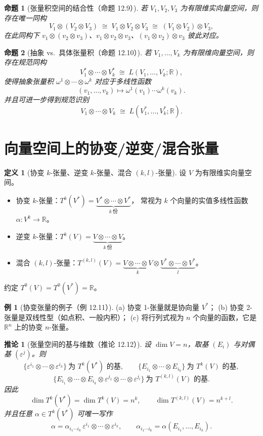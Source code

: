 \documentclass[11pt]{article}
\theoremstyle{definition}
\newtheorem{definition}{定义}[section]
\newtheorem{example}{例}[section]
\theoremstyle{plain}
\newtheorem{proposition}{命题}[section]
\newtheorem{corollary}{推论}[section]
\newcommand{\R}{\mathbb{R}}
\newcommand{\ot}{\otimes}
\begin{document}
\begin{proposition}[张量积空间的结合性（命题 12.9）]
若 $V_1,V_2,V_3$ 为有限维实向量空间，则存在唯一同构
\[
V_1\ot(V_2\ot V_3)\;\cong\; V_1\ot V_2\ot V_3\;\cong\; (V_1\ot V_2)\ot V_3,
\]
在此同构下 $v_1\ot(v_2\ot v_3)$、$v_1\ot v_2\ot v_3$、$(v_1\ot v_2)\ot v_3$ 彼此对应。
\end{proposition}

\begin{proposition}[抽象 vs.\ 具体张量积（命题 12.10）]
若 $V_1,\dots,V_k$ 为有限维向量空间，则存在规范同构
\[
V_1^*\ot\cdots\ot V_k^*\;\cong\; L(V_1,\dots,V_k;\R),
\]
使得抽象张量积 $\omega^1\ot\cdots\ot\omega^k$ 对应于多线性函数
\[
(v_1,\dots,v_k)\mapsto \omega^1(v_1)\cdots\omega^k(v_k).
\]
并且可进一步得到规范识别
\[
V_1\ot\cdots\ot V_k\;\cong\; L(V_1^*,\dots,V_k^*;\R).
\]
\end{proposition}

\section{向量空间上的协变/逆变/混合张量}

\begin{definition}[协变 $k$-张量、逆变 $k$-张量、混合 $(k,l)$-张量]
设 $V$ 为有限维实向量空间。
\begin{itemize}[leftmargin=2em]
\item 协变 $k$-张量：$T^k(V^*)= \underbrace{V^*\ot\cdots\ot V^*}_{k\ \text{份}}$，
常视为 $k$ 个向量的实值多线性函数 $\alpha:V^k\to\R$。
\item 逆变 $k$-张量：$T^k(V)= \underbrace{V\ot\cdots\ot V}_{k\ \text{份}}$。
\item 混合 $(k,l)$-张量：$T^{(k,l)}(V)= \underbrace{V\ot\cdots\ot V}_{k}\ot \underbrace{V^*\ot\cdots\ot V^*}_{l}$。
\end{itemize}
约定 $T^0(V)=T^0(V^*)=\R$。
\end{definition}

\begin{example}[协变张量的例子（例 12.11）]
(a) 协变 1-张量就是协向量 $V^*$；\quad
(b) 协变 2-张量是双线性型（如点积、一般内积）；\quad
(c) 将行列式视为 $n$ 个向量的函数，它是 $\R^n$ 上的协变 $n$-张量。
\end{example}

\begin{corollary}[张量空间的基与维数（推论 12.12）]
设 $\dim V=n$，取基 $(E_i)$ 与对偶基 $(\varepsilon^j)$。则
\[
\{\varepsilon^{i_1}\ot\cdots\ot\varepsilon^{i_k}\}\ \text{为 }T^k(V^*)\text{ 的基},\qquad
\{E_{i_1}\ot\cdots\ot E_{i_k}\}\ \text{为 }T^k(V)\text{ 的基},
\]
\[
\{E_{i_1}\ot\cdots\ot E_{i_k}\ot \varepsilon^{j_1}\ot\cdots\ot \varepsilon^{j_l}\}\ \text{为 }T^{(k,l)}(V)\text{ 的基}.
\]
因此
\[
\dim T^k(V^*)=\dim T^k(V)=n^k,\qquad \dim T^{(k,l)}(V)=n^{k+l}.
\]
并且任意 $\alpha\in T^k(V^*)$ 可唯一写作
\[
\alpha=\alpha_{i_1\cdots i_k}\,\varepsilon^{i_1}\ot\cdots\ot\varepsilon^{i_k},\qquad
\alpha_{i_1\cdots i_k}=\alpha(E_{i_1},\dots,E_{i_k}).
\]
\end{corollary}
\end{document}
